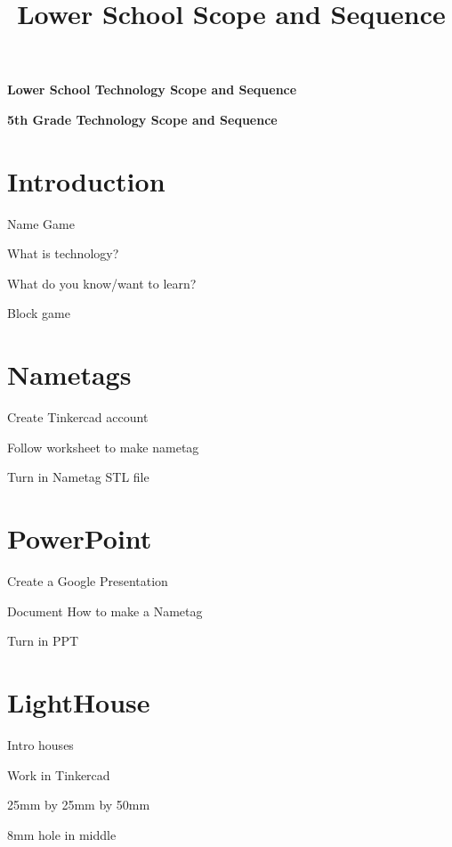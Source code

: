 \documentclass{article}
\def\FithGradeone{Nametags}
\def\FithGradetwo{PowerPoint}
\def\FithGradeThree{LightHouse}
\begin{document}
	\title{Lower School Scope and Sequence}
	\begin{titlepage}
		\begin{center}
			\Huge\textbf{Lower School Technology Scope and Sequence}\\
		\end{center}
	\end{titlepage}
	

	\Large\textbf{5th Grade Technology Scope and Sequence}
	\vspace{1cm}
	\section{Introduction}
	\begin{todolist}
		\item Name Game
		\item What is technology?
		\item What do you know/want to learn?
		\item Block game
	\end{todolist}
	\section{\FithGradeone}
	\begin{todolist}
		\item Create Tinkercad account
		\item Follow worksheet to make nametag
		\item Turn in Nametag STL file
	\end{todolist}
	\section{\FithGradetwo}
	\begin{todolist}
		\item Create a Google Presentation
		\item Document How to make a Nametag
		\item Turn in PPT
	\end{todolist}
	\section{\FithGradeThree}
	\begin{todolist}
		\item Intro houses
		\item Work in Tinkercad
		\item 25mm by 25mm by 50mm
		\item 8mm hole in middle 
	\end{todolist}
\end{document}
